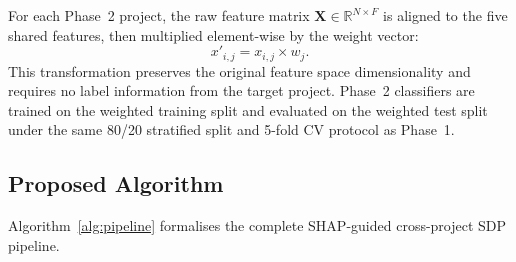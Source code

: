 \documentclass[12pt, a4paper]{article}
\begin{document}
For each Phase~2 project, the raw feature matrix
$\mathbf{X} \in \mathbb{R}^{N \times F}$ is aligned to the five shared
features, then multiplied element-wise by the weight vector:
\begin{equation}
  x'_{i,j} = x_{i,j} \times w_j.
  \label{eq:transform}
\end{equation}
This transformation preserves the original feature space dimensionality and
requires no label information from the target project. Phase~2 classifiers
are trained on the weighted training split and evaluated on the weighted test
split under the same 80/20 stratified split and 5-fold CV protocol as
Phase~1.

\subsection{Proposed Algorithm}
\label{sec:algo}

Algorithm~\ref{alg:pipeline} formalises the complete SHAP-guided cross-project
SDP pipeline.
\end{document}
